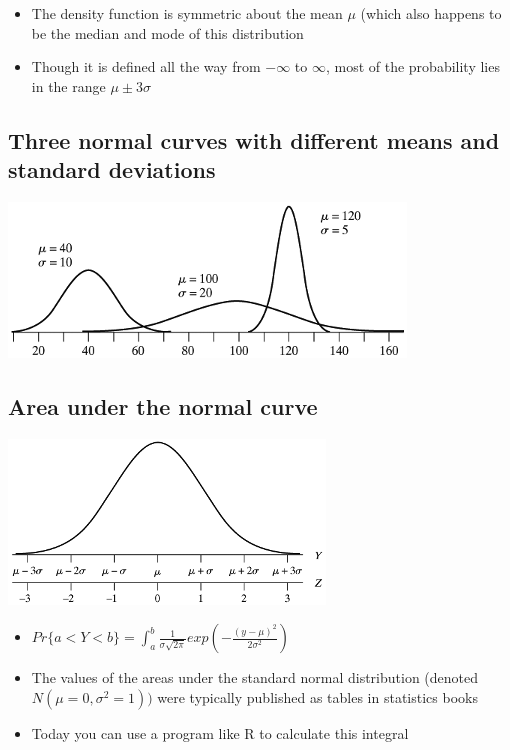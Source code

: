 \documentclass[
]{book}
\providecommand{\tightlist}{%
  \setlength{\itemsep}{0pt}\setlength{\parskip}{0pt}}
\begin{document}
\begin{itemize}
\tightlist
\item
  The density function is symmetric about the mean \(\mu\) (which also happens to be the median and mode of this distribution
\item
  Though it is defined all the way from \(-\infty\) to \(\infty\), most of the probability lies in the range \(\mu\pm3\sigma\)
\end{itemize}

\hypertarget{three-normal-curves-with-different-means-and-standard-deviations}{%
\subsection{Three normal curves with different means and standard deviations}\label{three-normal-curves-with-different-means-and-standard-deviations}}

\includegraphics[width=0.5\linewidth]{./2_49}

\hypertarget{area-under-the-normal-curve}{%
\subsection{Area under the normal curve}\label{area-under-the-normal-curve}}

\includegraphics[width=0.5\linewidth]{./2_50}

\begin{itemize}
\tightlist
\item
  \(Pr\{a<Y<b\}=\int_a^b\frac{1}{\sigma\sqrt{2\pi}}exp\left(-\frac{(y-\mu)^2}{2\sigma^2}\right)\)
\item
  The values of the areas under the standard normal distribution (denoted \(N(\mu=0, \sigma^2=1))\) were typically published as tables in statistics books
\item
  Today you can use a program like R to calculate this integral
\end{itemize}
\end{document}
